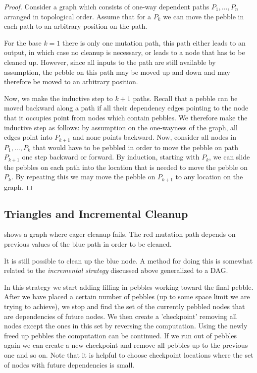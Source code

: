 \begin{proof}

Consider a graph which consists of one-way dependent paths $P_1,\dotsc,P_n$
arranged in topological order. Assume that for a $P_k$ we can move the pebble
in each path to an arbitrary position on the path.

For the base $k=1$ there is only one mutation path, this path either leads to
an output, in which case no cleanup is necessary, or leads to a node that has
to be cleaned up. However, since all inputs to the path are still available by
assumption, the pebble on this path may be moved up and down and may therefore
be moved to an arbitrary position. 

Now, we make the inductive step to $k+1$ paths. Recall that a pebble can be
moved backward along a path if all their dependency edges pointing to the node
that it occupies point from nodes which contain pebbles. We therefore make the
inductive step as follows: by assumption on the one-wayness of the graph, all
edges point into $P_{k+1}$ and none points backward. Now, consider all nodes in
$P_1, \ldots, P_k$ that would have to be pebbled in order to move the pebble on
path $P_{k+1}$ one step backward or forward. By induction, starting with $P_k$,
we can slide the pebbles on each path into the location that is needed to move
the pebble on $P_k$. By repeating this we may move the pebble on $P_{k+1}$ to
any location on the graph.

\end{proof}

\subsection{Triangles and Incremental Cleanup}

 shows a graph where eager cleanup fails. The red mutation
path depends on previous values of the blue path in order to be cleaned.

It is still possible to clean up the blue node. A method for doing this is
somewhat related to the \emph{incremental strategy} discussed above generalized
to a DAG.

In this strategy we start adding filling in pebbles working toward the final
pebble. After we have placed a certain number of pebbles (up to some space
limit we are trying to achieve), we stop and find the set of the currently
pebbled nodes that are dependencies of future nodes. We then create a
'checkpoint' removing all nodes except the ones in this set by reversing the
computation.  Using the newly freed up pebbles the computation can be
continued.  If we run out of pebbles again we can create a new checkpoint and
remove all pebbles up to the previous one and so on. Note that it is helpful to
choose checkpoint locations where the set of nodes with future dependencies is
small.

